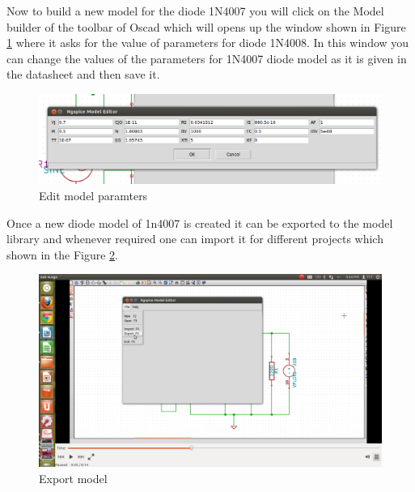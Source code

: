 Now to build a new model for the diode 1N4007 you will click on the Model builder of the toolbar of Oscad which will opens up the window shown in Figure \ref{edit} where it asks for the value of parameters for diode 1N4008. In this window you can change the values of the parameters for 1N4007 diode model as it is given in the datasheet and then save it.

\begin{figure}[h]%
\begin{center}
\includegraphics[width=1\linewidth]{figures/model-parameters.png}%
\caption{Edit model paramters}
\label{edit}
\end{center}
\end{figure}

Once a new diode model of 1n4007 is created it can be exported to the model library and whenever required one can import it for different projects which shown in the Figure \ref{export}.

\begin{figure}[h]%
\begin{center}
\includegraphics[width=1\linewidth]{figures/model-build-export.png}%
\caption{Export model}
\label{export}
\end{center}
\end{figure}




